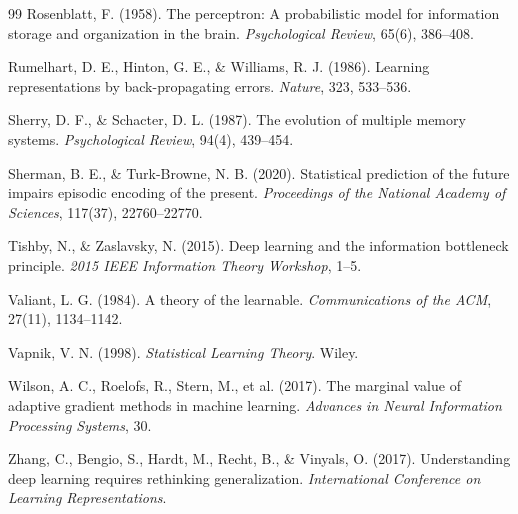 \documentclass[12pt,a4paper]{article}
\begin{document}
\begin{thebibliography}{99}
Rosenblatt, F. (1958).
The perceptron: A probabilistic model for information storage and organization in the brain.
\textit{Psychological Review}, 65(6), 386--408.

Rumelhart, D. E., Hinton, G. E., \& Williams, R. J. (1986).
Learning representations by back-propagating errors.
\textit{Nature}, 323, 533--536.

Sherry, D. F., \& Schacter, D. L. (1987).
The evolution of multiple memory systems.
\textit{Psychological Review}, 94(4), 439--454.

Sherman, B. E., \& Turk-Browne, N. B. (2020).
Statistical prediction of the future impairs episodic encoding of the present.
\textit{Proceedings of the National Academy of Sciences}, 117(37), 22760--22770.

Tishby, N., \& Zaslavsky, N. (2015).
Deep learning and the information bottleneck principle.
\textit{2015 IEEE Information Theory Workshop}, 1--5.

Valiant, L. G. (1984).
A theory of the learnable.
\textit{Communications of the ACM}, 27(11), 1134--1142.

Vapnik, V. N. (1998).
\textit{Statistical Learning Theory}.
Wiley.

Wilson, A. C., Roelofs, R., Stern, M., et al. (2017).
The marginal value of adaptive gradient methods in machine learning.
\textit{Advances in Neural Information Processing Systems}, 30.

Zhang, C., Bengio, S., Hardt, M., Recht, B., \& Vinyals, O. (2017).
Understanding deep learning requires rethinking generalization.
\textit{International Conference on Learning Representations}.

\end{thebibliography}
\end{document}
